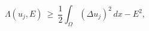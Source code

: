 \begin{equation*}
\Lambda(u_j,E)\ \ge\ \frac12\int_\Omega(\Delta u_j)^2\,dx-E^2 ,
\end{equation*}


